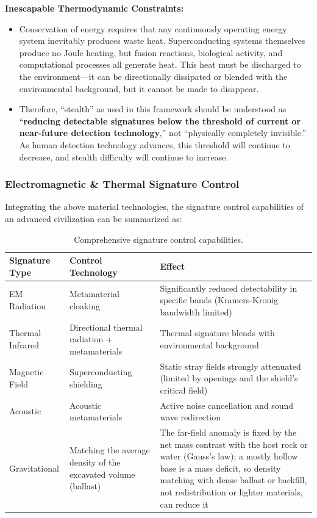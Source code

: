 \documentclass[aps,prd,twocolumn,superscriptaddress,nofootinbib]{revtex4-2}
\begin{document}
\textbf{Inescapable Thermodynamic Constraints:}

\begin{itemize}
  \item Conservation of energy requires that any continuously operating energy system inevitably produces waste heat. Superconducting systems themselves produce no Joule heating, but fusion reactions, biological activity, and computational processes all generate heat. This heat must be discharged to the environment---it can be directionally dissipated or blended with the environmental background, but it cannot be made to disappear.
  \item Therefore, ``stealth'' as used in this framework should be understood as ``\textbf{reducing detectable signatures below the threshold of current or near-future detection technology},'' not ``physically completely invisible.'' As human detection technology advances, this threshold will continue to decrease, and stealth difficulty will continue to increase.
\end{itemize}

\subsubsection{Electromagnetic \& Thermal Signature Control}\label{sec:em-thermal-control}

Integrating the above material technologies, the signature control capabilities of an advanced civilization can be summarized as:

\begin{table}[htbp]
\caption{Comprehensive signature control capabilities.}
\label{tab:signature-control}
\footnotesize
\begin{tabular}{P{0.172\textwidth}P{0.272\textwidth}P{0.453\textwidth}}
\toprule
Signature Type & Control Technology & Effect \\
\midrule
EM Radiation & Metamaterial cloaking & Significantly reduced detectability in specific bands (Kramers-Kronig bandwidth limited) \\
Thermal Infrared & Directional thermal radiation + metamaterials & Thermal signature blends with environmental background \\
Magnetic Field & Superconducting shielding & Static stray fields strongly attenuated (limited by openings and the shield's critical field) \\
Acoustic & Acoustic metamaterials & Active noise cancellation and sound wave redirection \\
Gravitational & Matching the average density of the excavated volume (ballast) & The far-field anomaly is fixed by the net mass contrast with the host rock or water (Gauss's law); a mostly hollow base is a mass deficit, so density matching with dense ballast or backfill, not redistribution or lighter materials, can reduce it \\
\bottomrule
\end{tabular}
\end{table}
\end{document}
